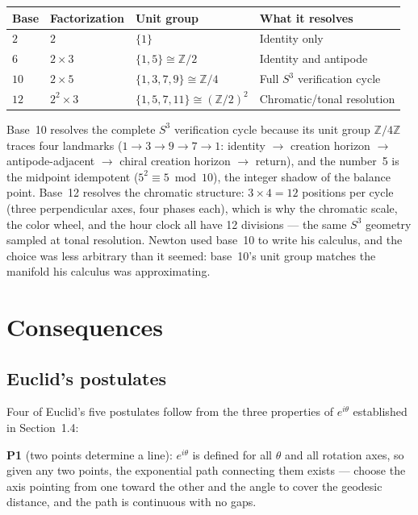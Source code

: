 \documentclass[12pt]{article}
\begin{document}
\begin{center}
\begin{tabular}{l l l l}
    \toprule
    Base & Factorization & Unit group & What it resolves \\
    \midrule
    $2$ & $2$ & $\{1\}$ & Identity only \\
    $6$ & $2 \times 3$ & $\{1,5\} \cong \mathbb{Z}/2$ & Identity and antipode \\
    $10$ & $2 \times 5$ & $\{1,3,7,9\} \cong \mathbb{Z}/4$ & Full $S^3$ verification cycle \\
    $12$ & $2^2 \times 3$ & $\{1,5,7,11\} \cong (\mathbb{Z}/2)^2$ & Chromatic/tonal resolution \\
    \bottomrule
\end{tabular}
\end{center}

Base~10 resolves the complete $S^3$ verification cycle because its unit group $\mathbb{Z}/4\mathbb{Z}$ traces four landmarks ($1 \to 3 \to 9 \to 7 \to 1$: identity $\to$ creation horizon $\to$ antipode-adjacent $\to$ chiral creation horizon $\to$ return), and the number~5 is the midpoint idempotent ($5^2 \equiv 5 \bmod 10$), the integer shadow of the balance point. Base~12 resolves the chromatic structure: $3 \times 4 = 12$ positions per cycle (three perpendicular axes, four phases each), which is why the chromatic scale, the color wheel, and the hour clock all have 12 divisions --- the same $S^3$ geometry sampled at tonal resolution. Newton used base~10 to write his calculus, and the choice was less arbitrary than it seemed: base~10's unit group matches the manifold his calculus was approximating.


\section{Consequences}

\subsection{Euclid's postulates}

Four of Euclid's five postulates follow from the three properties of $e^{i\theta}$ established in Section~1.4:

\textbf{P1} (two points determine a line): $e^{i\theta}$ is defined for all $\theta$ and all rotation axes, so given any two points, the exponential path connecting them exists --- choose the axis pointing from one toward the other and the angle to cover the geodesic distance, and the path is continuous with no gaps.
\end{document}
